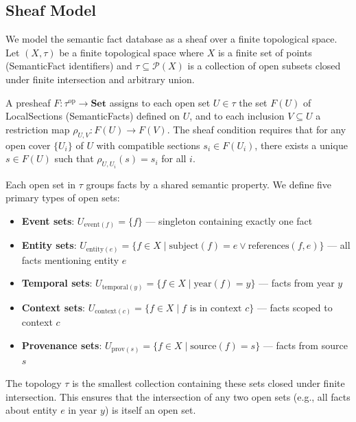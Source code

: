 
\subsection{Sheaf Model}

We model the semantic fact database as a sheaf over a finite topological space. 
Let $(X, \tau)$ be a finite topological space where $X$ is a finite set of points (SemanticFact identifiers) and $\tau \subseteq \mathcal{P}(X)$ is a collection of open subsets closed under finite intersection and arbitrary union.

\begin{definition}
A presheaf $F: \tau^{\text{op}} \to \mathbf{Set}$ assigns to each open set $U \in \tau$ the set $F(U)$ of LocalSections (SemanticFacts) defined on $U$, and to each inclusion $V \subseteq U$ a restriction map $\rho_{U,V}: F(U) \to F(V)$. The sheaf condition requires that for any open cover $\{U_i\}$ of $U$ with compatible sections $s_i \in F(U_i)$, there exists a unique $s \in F(U)$ such that $\rho_{U,U_i}(s) = s_i$ for all $i$.
\end{definition}

Each open set in $\tau$ groups facts by a shared semantic property. We define five primary types of open sets:

\begin{itemize}
    \item \textbf{Event sets}: $U_{\text{event}(f)} = \{f\}$ — singleton containing exactly one fact
    \item \textbf{Entity sets}: $U_{\text{entity}(e)} = \{f \in X \mid \text{subject}(f) = e \lor \text{references}(f, e)\}$ — all facts mentioning entity $e$
    \item \textbf{Temporal sets}: $U_{\text{temporal}(y)} = \{f \in X \mid \text{year}(f) = y\}$ — facts from year $y$
    \item \textbf{Context sets}: $U_{\text{context}(c)} = \{f \in X \mid f \text{ is in context } c\}$ — facts scoped to context $c$
    \item \textbf{Provenance sets}: $U_{\text{prov}(s)} = \{f \in X \mid \text{source}(f) = s\}$ — facts from source $s$
\end{itemize}

The topology $\tau$ is the smallest collection containing these sets closed under finite intersection. This ensures that the intersection of any two open sets (e.g., all facts about entity $e$ in year $y$) is itself an open set.
\endinput
